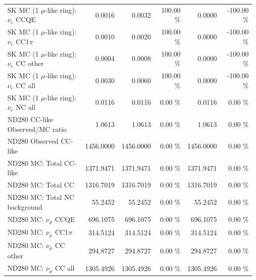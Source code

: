 \begin{table}
\begin{tabular}{| l | r | r  r | r  r |}
                             SK MC (1 $\mu$-like ring): $\nu_{e}$ CCQE &          0.0016 &          0.0032 & 100.00 \%  &          0.0000 & -100.00 \%  \\ 
                         SK MC (1 $\mu$-like ring): $\nu_{e}$ CC1$\pi$ &          0.0010 &          0.0020 & 100.00 \%  &          0.0000 & -100.00 \%  \\ 
                         SK MC (1 $\mu$-like ring): $\nu_{e}$ CC other &          0.0004 &          0.0008 & 100.00 \%  &          0.0000 & -100.00 \%  \\ 
                           SK MC (1 $\mu$-like ring): $\nu_{e}$ CC all &          0.0030 &          0.0060 & 100.00 \%  &          0.0000 & -100.00 \%  \\ 
                           SK MC (1 $\mu$-like ring): $\nu_{e}$ NC all &          0.0116 &          0.0116 &  0.00 \%  &          0.0116 &  0.00 \%  \\ 
\hline
                                       ND280 CC-like Observed/MC ratio &          1.0613 &          1.0613 &  0.00 \%  &          1.0613 &  0.00 \%  \\ 
                                                ND280 Observed CC-like &       1456.0000 &       1456.0000 &  0.00 \%  &       1456.0000 &  0.00 \%  \\ 
                                               ND280 MC: Total CC-like &       1371.9471 &       1371.9471 &  0.00 \%  &       1371.9471 &  0.00 \%  \\ 
                                                    ND280 MC: Total CC &       1316.7019 &       1316.7019 &  0.00 \%  &       1316.7019 &  0.00 \%  \\ 
                                         ND280 MC: Total NC background &         55.2452 &         55.2452 &  0.00 \%  &         55.2452 &  0.00 \%  \\ 
\hline
                                            ND280 MC: $\nu_{\mu}$ CCQE &        696.1075 &        696.1075 &  0.00 \%  &        696.1075 &  0.00 \%  \\ 
                                        ND280 MC: $\nu_{\mu}$ CC1$\pi$ &        314.5124 &        314.5124 &  0.00 \%  &        314.5124 &  0.00 \%  \\ 
                                        ND280 MC: $\nu_{\mu}$ CC other &        294.8727 &        294.8727 &  0.00 \%  &        294.8727 &  0.00 \%  \\ 
                                          ND280 MC: $\nu_{\mu}$ CC all &       1305.4926 &       1305.4926 &  0.00 \%  &       1305.4926 &  0.00 \%  \\ 

\end{tabular}
\end{table}
